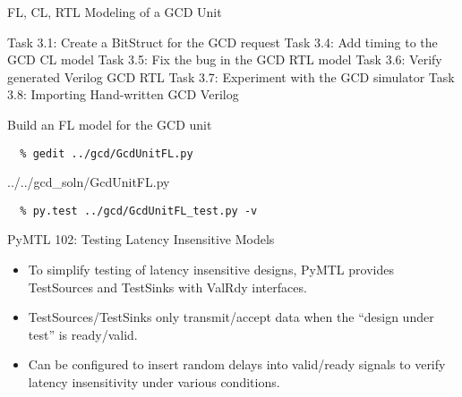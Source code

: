 
\begin{frame}{ FL, CL, RTL Modeling of a GCD Unit}
\begin{cbxlist}
  \1 Task 3.1: Create a BitStruct for the GCD request
  \1 
  \1 
  \1 Task 3.4: Add timing to the GCD CL model
  \1 Task 3.5: Fix the bug in the GCD RTL model
  \1 Task 3.6: Verify generated Verilog GCD RTL
  \1 Task 3.7: Experiment with the GCD simulator
  \1 Task 3.8: Importing Hand-written GCD Verilog
\end{cbxlist}
\end{frame}

\begin{task}\begin{frame}[fragile]{Build an FL model for the GCD unit}

\vspace{-0.15in}
\begin{Verbatim}[commandchars=\\\{\}]
  % cd \midtilde/pymtl-tut/build
  % gedit ../gcd/GcdUnitFL.py
\end{Verbatim}
\vspace{-0.2in}

%
{../../gcd_soln/GcdUnitFL.py}

\vspace{-0.22in}
\begin{verbatim}
  % py.test ../gcd/GcdUnitFL_test.py -v
\end{verbatim}
\end{frame}
\end{task}

\begin{frame}{PyMTL 102: Testing Latency Insensitive Models}

\begin{itemize}
  \item To simplify testing of latency insensitive designs, PyMTL provides
        TestSources and TestSinks with ValRdy interfaces.
  \smallskip
  \item TestSources/TestSinks only transmit/accept data when the ``design
        under test'' is ready/valid.
  \smallskip
  \item Can be configured to insert random delays into valid/ready signals
        to verify latency insensitivity under various conditions.
\end{itemize}

  \smallskip
\end{frame}

